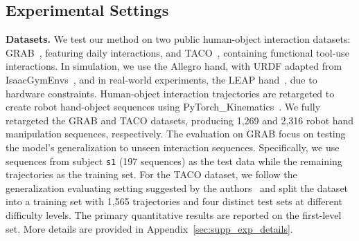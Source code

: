 
\vspace{-10pt}
\subsection{Experimental Settings} \label{sec:exp_setting}
\vspace{-5pt}



\noindent\textbf{Datasets.}
We test our method on two public human-object interaction  datasets:
GRAB~\citep{taheri2020grab}, featuring daily interactions, and 
TACO~\citep{liu2024taco}, containing functional tool-use interactions. 
In simulation, we use the Allegro hand, with URDF adapted from IsaacGymEnvs~\citep{makoviychuk2021isaac}, and in real-world experiments, the LEAP hand~\citep{Shaw2023LEAPHL}, due to hardware constraints. Human-object interaction trajectories are retargeted to create robot hand-object sequences using PyTorch\_Kinematics~\citep{Zhong_PyTorch_Kinematics_2024}. We fully retargeted the GRAB and TACO datasets, producing 1,269 and 2,316 robot hand manipulation sequences, respectively. The evaluation on GRAB focus on testing the model’s generalization to unseen interaction sequences. 
Specifically, we use sequences from subject \texttt{s1} (197 sequences) as the test data while the remaining trajectories as the training set. 
For the TACO dataset, we follow the generalization evaluating setting suggested by the authors~\citep{liu2024taco} and split the dataset into a training set with 1,565 trajectories and four distinct test sets at different difficulty levels. The primary quantitative results are reported on the first-level set. More details are provided in Appendix~\ref{sec:supp_exp_details}. 

